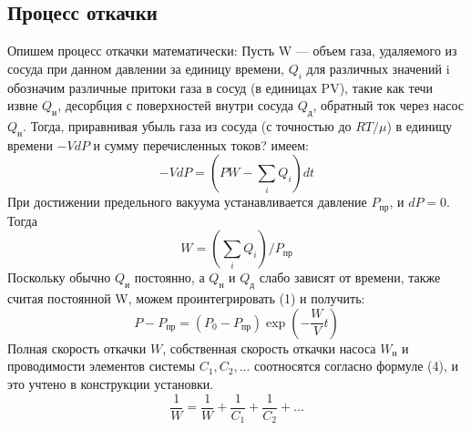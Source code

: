 \documentclass[12pt]{article}
\begin{document}
 \subsection*{Процесс откачки}
Опишем процесс откачки математически: 
Пусть W --- объем газа, удаляемого из сосуда при данном давлении за единицу времени, $Q_i$ для различных значений i обозначим различные притоки газа в сосуд (в единицах PV), такие как течи извне $Q_\text{и}$, десорбция с поверхностей внутри сосуда $Q_\text{д}$, обратный ток через насос $Q_\text{н}$. Тогда, приравнивая убыль газа из сосуда (с точностью до $RT/\mu$) в единицу времени $-VdP$ и сумму перечисленных токов? имеем:
 \begin{equation}
 	-VdP = (PW - \sum_i Q_i)dt
 \end{equation}
 При достижении предельного вакуума устанавливается давление $P_{\text{пр}}$, и $dP = 0$. Тогда
 \begin{equation}
 	 W = ( \sum_i Q_i )/P_{\text{пр}}
 \end{equation}
 Поскольку обычно $Q_\text{и}$ постоянно, а $Q_\text{н}$ и $Q_\text{д}$ слабо зависят от времени, также считая постоянной W, можем проинтегрировать (1) и получить:
 \begin{equation}
 	P - P_{\text{пр}} = (P_0 - P_{\text{пр}})\exp(-\frac{W}{V}t)
 \end{equation}
Полная скорость откачки $W$, собственная скорость откачки насоса $W_{\text{н}}$ и проводимости элементов системы $C_1, C_2,...$ соотносятся согласно формуле (4), и это учтено в конструкции установки.
 \begin{equation}
 \frac{1}{W} = \frac{1}{W} + \frac{1}{C_1} + \frac{1}{C_2} + ...
\end{equation}
\end{document}
